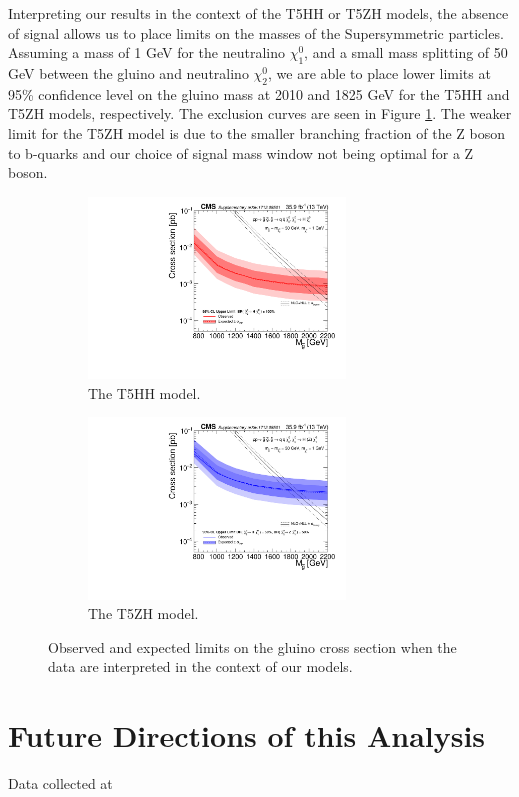 Interpreting our results in the context of the T5HH or T5ZH models, the absence of signal allows us to place limits on the masses of the Supersymmetric particles. Assuming a mass of 1 GeV for the neutralino $\chi_{1}^{0}$, and a small mass splitting of 50 GeV between the gluino and neutralino $\chi_{2}^{0}$, we are able to place lower limits at 95\% confidence level on the gluino mass at 2010 and 1825 GeV for the T5HH and T5ZH models, respectively. The exclusion curves are seen in Figure \ref{fig:brazil}. The weaker limit for the T5ZH model is due to the smaller branching fraction of the Z boson to b-quarks and our choice of signal mass window not being optimal for a Z boson.

\begin{figure}[htbp]
\begin{subfigure}[b]{0.5\textwidth}
\begin{centering}
\includegraphics[width=0.75\textwidth]{figs/brazilT5HHResults.pdf}
\caption{The T5HH model.}
\end{centering}
\end{subfigure}
\begin{subfigure}[b]{0.5\textwidth}
\begin{centering}
\includegraphics[width=0.75\textwidth]{figs/brazilT5ZHResults.pdf}
\caption{The T5ZH model.}
\end{centering}
\end{subfigure}
\caption{Observed and expected limits on the gluino cross section when the data are interpreted in the context of our models.}
\label{fig:brazil}
\end{figure}

\section{Future Directions of this Analysis}
Data collected at 




